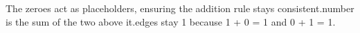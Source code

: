 \documentclass[preview]{standalone}
\begin{document}
\begin{center}
The zeroes act as placeholders, ensuring the addition rule stays consistent.\Each number is the sum of the two above it.\The edges stay 1 because 1 + 0 = 1 and 0 + 1 = 1.
\end{center}
\end{document}
